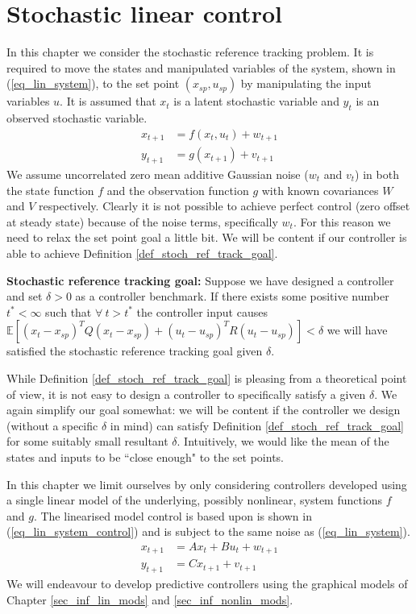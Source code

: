\chapter{Stochastic linear control}
\label{sec_linear_control}
In this chapter we consider the stochastic reference tracking problem. It is required to move the states and manipulated variables of the system, shown in (\ref{eq_lin_system}), to the set point $(x_{sp}, u_{sp})$ by manipulating the input variables $u$. It is assumed that $x_t$ is a latent stochastic variable and $y_t$ is an observed stochastic variable.
\begin{equation}
\begin{aligned}
x_{t+1} &= f(x_t, u_t) + w_{t+1}  \\
y_{t+1} &= g(x_{t+1}) + v_{t+1}  
\end{aligned}
\label{eq_lin_system}
\end{equation}
We assume uncorrelated zero mean additive Gaussian noise ($w_t$ and $v_t$) in both the state function $f$ and the observation function $g$ with known covariances $W$ and $V$ respectively. Clearly it is not possible to achieve perfect control (zero offset at steady state) because of the noise terms, specifically $w_t$. For this reason we need to relax the set point goal a little bit. We will be content if our controller is able to achieve Definition \ref{def_stoch_ref_track_goal}.
\begin{defn}
\textbf{Stochastic reference tracking goal:} Suppose we have designed a controller and set $\delta > 0$ as a controller benchmark. If there exists some positive number $t^* < \infty$ such that $\forall~t > t^*$ the controller input causes $\mathbb{E}[(x_t-x_{sp})^TQ(x_t-x_{sp}) + (u_t-u_{sp})^TR(u_t-u_{sp})] < \delta$ we will have satisfied the stochastic reference tracking goal given $\delta$.
\label{def_stoch_ref_track_goal}
\end{defn}
While Definition \ref{def_stoch_ref_track_goal} is pleasing from a theoretical point of view, it is not easy to design a controller to specifically satisfy a given $\delta$. We again simplify our goal somewhat: we will be content if the controller we design (without a specific $\delta$ in mind) can satisfy Definition \ref{def_stoch_ref_track_goal} for some suitably small resultant  $\delta$. Intuitively, we would like the mean of the states and inputs to be ``close enough" to the set points. 

In this chapter we limit ourselves by only considering controllers developed using a single linear model of the underlying, possibly nonlinear, system functions $f$ and $g$. The linearised model control is based upon is shown in (\ref{eq_lin_system_control}) and is subject to the same noise as (\ref{eq_lin_system}).
\begin{equation}
\begin{aligned}
x_{t+1} &= Ax_t + Bu_t + w_{t+1} \\
y_{t+1} &= Cx_{t+1} + v_{t+1} 
\end{aligned}
\label{eq_lin_system_control}
\end{equation}
We will endeavour to develop predictive controllers using the graphical models of Chapter \ref{sec_inf_lin_mods} and \ref{sec_inf_nonlin_mods}.

